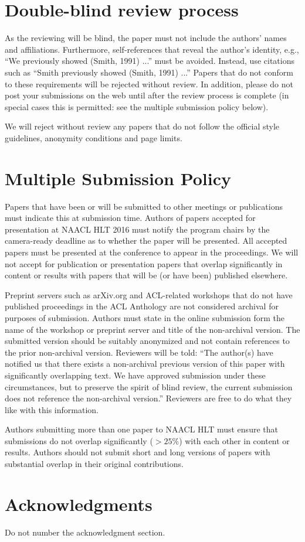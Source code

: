 \documentclass[11pt,letterpaper]{article}
\begin{document}
\section{Double-blind review process}
\label{sec:blind}

As the reviewing will be blind, the paper must not include the
authors' names and affiliations.  Furthermore, self-references that
reveal the author's identity, e.g., ``We previously showed (Smith,
1991) ...'' must be avoided. Instead, use citations such as ``Smith
previously showed (Smith, 1991) ...'' Papers that do not conform to
these requirements will be rejected without review. In addition,
please do not post your submissions on the web until after the
review process is complete (in special cases this is permitted: see 
the multiple submission policy below).

We will reject without review any papers that do not follow the
official style guidelines, anonymity conditions and page limits.

\section{Multiple Submission Policy}

Papers that have been or will be submitted to other meetings or
publications must indicate this at submission time. Authors of
papers accepted for presentation at NAACL HLT 2016 must notify the
program chairs by the camera-ready deadline as to whether the paper
will be presented. All accepted papers must be presented at the
conference to appear in the proceedings. We will not accept for
publication or presentation papers that overlap significantly in
content or results with papers that will be (or have been) published
elsewhere.

Preprint servers such as arXiv.org and ACL-related workshops that
do not have published proceedings in the ACL Anthology are not
considered archival for purposes of submission. Authors must state
in the online submission form the name of the workshop or preprint
server and title of the non-archival version.  The submitted version
should be suitably anonymized and not contain references to the
prior non-archival version. Reviewers will be told: ``The author(s)
have notified us that there exists a non-archival previous version
of this paper with significantly overlapping text. We have approved
submission under these circumstances, but to preserve the spirit
of blind review, the current submission does not reference the
non-archival version.'' Reviewers are free to do what they like with
this information.

Authors submitting more than one paper to NAACL HLT must ensure
that submissions do not overlap significantly ($>25\%$) with each other
in content or results. Authors should not submit short and long
versions of papers with substantial overlap in their original
contributions.

\section*{Acknowledgments}

Do not number the acknowledgment section.



\end{document}
